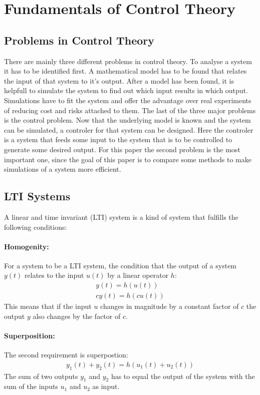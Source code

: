 \section{Fundamentals of Control Theory}

\subsection{Problems in Control Theory}
There are mainly three different problems in control theory.
To analyse a system it has to be identified first.
A mathematical model has to be found that relates the input of that system to it's output.
After a model has been found, it is helpfull to simulate the system to find out which input results in which output.
Simulations have to fit the system and offer the advantage over real experiments of reducing cost and risks attached to them.
The last of the three major problems is the control problem.
Now that the underlying model is known and the system can be simulated, a controler for that system can be designed.
Here the controler is a system that feeds some input to the system that is to be controlled to generate some desired output.
\cite{DouglasBa}
For this paper the second problem is the most important one, since the goal of this paper is to compare some methods to make simulations of a system more efficient.
\subsection{LTI Systems}
A linear and time invariant (LTI) system is a kind of system that fulfills the following conditions:
\paragraph{Homogenity:}
For a system to be a LTI system, the condition that the output of a system \(y(t)\) relates to the input \(u(t)\) by a linear operator \(h\):
\begin{gather}
y(t) = h(u(t)) \\
cy(t) = h(cu(t))
\end{gather}
This means that if the input \(u\) changes in magnitude by a constant factor of \(c\) the output \(y\) also changes by the factor of \(c\).
\paragraph{Superposition:}
The second requirement is superpostion:
\begin{gather}
y_1(t) + y_2(t) = h(u_1(t) + u_2(t))
\end{gather}
The sum of two outputs \(y_1\) and \(y_2\) has to equal the output of the system with the sum of the inputs \(u_1\) and \(u_2\) as input.
